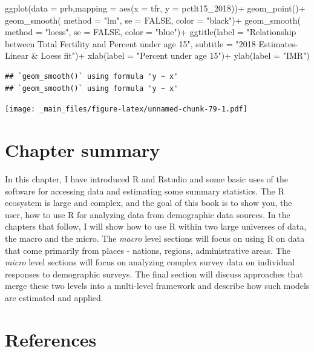 \documentclass[
]{book}
\newenvironment{Shaded}{\begin{snugshade}}{\end{snugshade}}
\newcommand{\AttributeTok}[1]{\textcolor[rgb]{0.77,0.63,0.00}{#1}}
\newcommand{\ConstantTok}[1]{\textcolor[rgb]{0.00,0.00,0.00}{#1}}
\newcommand{\FunctionTok}[1]{\textcolor[rgb]{0.00,0.00,0.00}{#1}}
\newcommand{\NormalTok}[1]{#1}
\newcommand{\SpecialCharTok}[1]{\textcolor[rgb]{0.00,0.00,0.00}{#1}}
\newcommand{\StringTok}[1]{\textcolor[rgb]{0.31,0.60,0.02}{#1}}
\begin{document}
\begin{Shaded}
\begin{Highlighting}[]
\FunctionTok{ggplot}\NormalTok{(}\AttributeTok{data =}\NormalTok{ prb,}\AttributeTok{mapping =} \FunctionTok{aes}\NormalTok{(}\AttributeTok{x =}\NormalTok{ tfr, }\AttributeTok{y =}\NormalTok{ pctlt15\_2018))}\SpecialCharTok{+}
  \FunctionTok{geom\_point}\NormalTok{()}\SpecialCharTok{+}
  \FunctionTok{geom\_smooth}\NormalTok{( }\AttributeTok{method =} \StringTok{"lm"}\NormalTok{,}
               \AttributeTok{se =} \ConstantTok{FALSE}\NormalTok{,}
               \AttributeTok{color =} \StringTok{"black"}\NormalTok{)}\SpecialCharTok{+}
  \FunctionTok{geom\_smooth}\NormalTok{( }\AttributeTok{method =} \StringTok{"loess"}\NormalTok{,}
               \AttributeTok{se =} \ConstantTok{FALSE}\NormalTok{,}
               \AttributeTok{color =} \StringTok{"blue"}\NormalTok{)}\SpecialCharTok{+}
  \FunctionTok{ggtitle}\NormalTok{(}\AttributeTok{label =} \StringTok{"Relationship between Total Fertility and Percent under age 15"}\NormalTok{,}
          \AttributeTok{subtitle =} \StringTok{"2018 Estimates{-} Linear \& Loess fit"}\NormalTok{)}\SpecialCharTok{+}
  \FunctionTok{xlab}\NormalTok{(}\AttributeTok{label =} \StringTok{"Percent under age 15"}\NormalTok{)}\SpecialCharTok{+}
  \FunctionTok{ylab}\NormalTok{(}\AttributeTok{label =} \StringTok{"IMR"}\NormalTok{)}
\end{Highlighting}
\end{Shaded}

\begin{verbatim}
## `geom_smooth()` using formula 'y ~ x'
## `geom_smooth()` using formula 'y ~ x'
\end{verbatim}

\texttt{[image: \_main\_files/figure-latex/unnamed-chunk-79-1.pdf]}

\hypertarget{chapter-summary}{%
\section{Chapter summary}\label{chapter-summary}}

In this chapter, I have introduced R and Rstudio and some basic uses of
the software for accessing data and estimating some summary statistics.
The R ecosystem is large and complex, and the goal of this book is to
show you, the user, how to use R for analyzing data from demographic
data sources. In the chapters that follow, I will show how to use R
within two large universes of data, the macro and the micro. The \emph{macro}
level sections will focus on using R on data that come primarily from
places - nations, regions, administrative areas. The \emph{micro} level
sections will focus on analyzing complex survey data on individual
responses to demographic surveys. The final section will discuss
approaches that merge these two levels into a multi-level framework and
describe how such models are estimated and applied.

\hypertarget{references}{%
\section{References}\label{references}}

  
\end{document}
